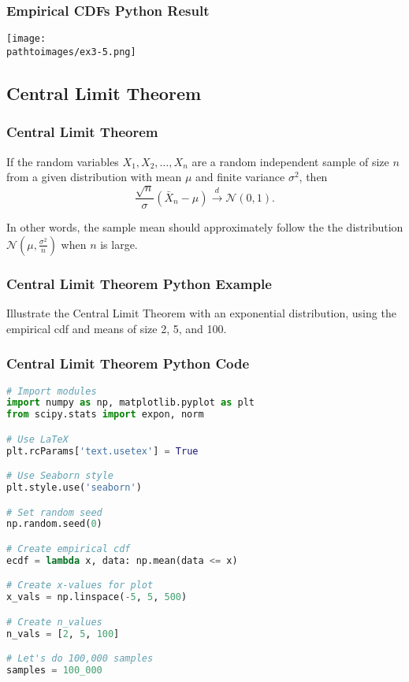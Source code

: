 \documentclass{beamer}
\newcommand{\pathtoimages}{/Users/charlesrambo/Desktop/Bootcamp24/Images}
\begin{document}
\begin{frame}[fragile]
\frametitle{Empirical CDFs Python Result}
\begin{center}
\texttt{[image: \\pathtoimages/ex3-5.png]}
\end{center}

\end{frame}

\subsection{Central Limit Theorem}

\begin{frame}
\frametitle{Central Limit Theorem}

\begin{Theorem}
If the random variables $X_1, X_2, \ldots, X_n$ are a random independent sample of size $n$ from a given distribution with mean $\mu$ and finite variance $\sigma^2$, then
$$
\frac{\sqrt{n}}{\sigma}\left(\bar{X}_n - \mu\right)\stackrel{d}{\longrightarrow} \mathcal{N}(0, 1).
$$
\end{Theorem}
In other words, the sample mean should approximately follow the the distribution $\mathcal{N}\left(\mu, \frac{\sigma^2}{n}\right)$ when $n$ is large.
\end{frame}

\begin{frame}
\frametitle{Central Limit Theorem Python Example}
\begin{Example}
Illustrate the Central Limit Theorem with an exponential distribution, using the empirical cdf and means of size 2, 5, and 100.
\end{Example}

\end{frame}

\begin{frame}[fragile]
\frametitle{Central Limit Theorem Python Code}
\begin{lstlisting}[language=Python]
# Import modules
import numpy as np, matplotlib.pyplot as plt
from scipy.stats import expon, norm

# Use LaTeX
plt.rcParams['text.usetex'] = True

# Use Seaborn style
plt.style.use('seaborn')

# Set random seed
np.random.seed(0)

# Create empirical cdf
ecdf = lambda x, data: np.mean(data <= x)

# Create x-values for plot
x_vals = np.linspace(-5, 5, 500)

# Create n_values
n_vals = [2, 5, 100]

# Let's do 100,000 samples
samples = 100_000
\end{lstlisting}

\end{frame}
\end{document}
